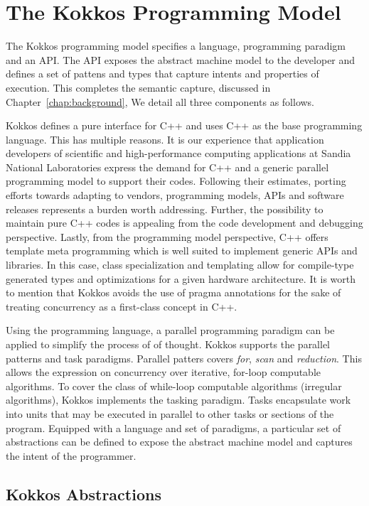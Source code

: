 \section{The Kokkos Programming Model}\label{chap:kokkosPM}
The Kokkos programming model specifies a language, programming paradigm and an API. The API exposes the abstract machine model to the developer and defines a set of pattens and types that capture intents and properties of execution. This completes the semantic capture, discussed in Chapter~\ref{chap:background}, We detail all three components as follows.

Kokkos defines a pure interface for C++ and uses C++ as the base programming language. This has multiple reasons. It is our experience that application developers of scientific and high-performance computing applications at Sandia National Laboratories express the demand for C++ and a generic parallel programming model to support their codes. Following their estimates, porting efforts towards adapting to vendors, programming models, APIs and software releases represents a burden worth addressing. Further, the possibility to maintain pure C++ codes is appealing from the code development and debugging perspective. 
Lastly, from the programming model perspective, C++ offers template meta programming which is well suited to implement generic APIs and libraries. In this case, class specialization and templating allow for compile-type generated types and optimizations for a given hardware architecture. It is worth to mention that Kokkos avoids the use of pragma annotations for the sake of treating concurrency as a first-class concept in C++. 

Using the programming language, a parallel programming paradigm can be applied to simplify the process of of thought. Kokkos supports the parallel patterns and task paradigms. Parallel patters covers \emph{for}, \emph{ scan} and \emph{reduction}. This allows the expression on concurrency over iterative, for-loop computable algorithms. To cover the class of while-loop computable algorithms (irregular algorithms), Kokkos implements the tasking paradigm. Tasks encapsulate work into units that may be executed in parallel to other tasks or sections of the program. Equipped with a language and set of paradigms, a particular set of abstractions can be defined to expose the abstract machine model and captures the intent of the programmer.


\subsection{Kokkos Abstractions}


